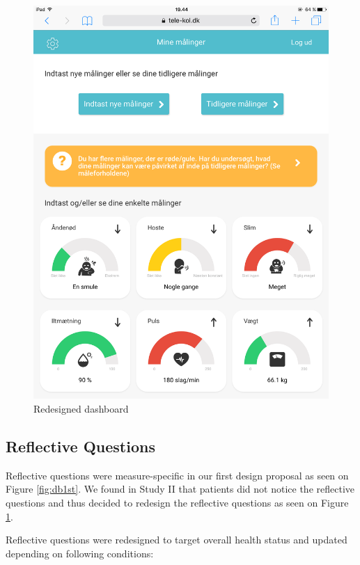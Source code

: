 \begin{figure}[h]
\begin{minipage}[b]{0.45\textwidth}
    \includegraphics[width=\textwidth]{images/implementation/db.PNG}
    \caption{Redesigned dashboard}
    \label{fig:db2nd}
  \end{minipage}
\end{figure}

\subsection*{Reflective Questions}
Reflective questions were measure-specific in our first design proposal as seen on Figure \ref{fig:db1st}. We found in Study II that patients did not notice the reflective questions and thus decided to redesign the reflective questions as seen on Figure \ref{fig:db2nd}. 

Reflective questions were redesigned to target overall health status and updated depending on following conditions: 
 
